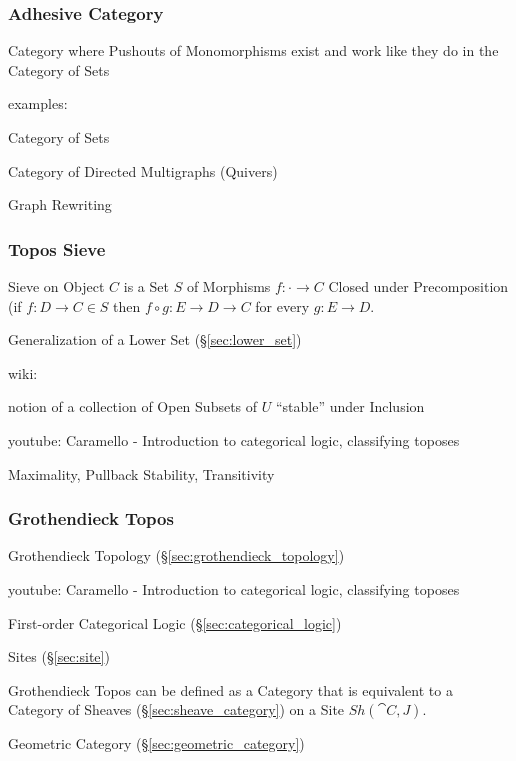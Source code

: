 \subsubsection{Adhesive Category}\label{sec:adhesive_category}

Category where Pushouts of Monomorphisms exist and work like they do in the
Category of Sets

examples:

Category of Sets

Category of Directed Multigraphs (Quivers)

Graph Rewriting %



\subsubsection{Topos Sieve}\label{sec:topos_sieve}

Sieve on Object $C$ is a Set $S$ of Morphisms $f : \cdot \rightarrow
C$ Closed under Precomposition (if $f : D \rightarrow C \in S$ then $f
\circ g : E \rightarrow D \rightarrow C$ for every $g : E \rightarrow
D$.

Generalization of a Lower Set (\S\ref{sec:lower_set})

wiki:

notion of a collection of Open Subsets of $U$ ``stable'' under
Inclusion %

youtube: Caramello - Introduction to categorical logic, classifying
toposes

Maximality, Pullback Stability, Transitivity %



\subsubsection{Grothendieck Topos}\label{sec:grothendieck_topos}

Grothendieck Topology (\S\ref{sec:grothendieck_topology})

youtube: Caramello - Introduction to categorical logic, classifying
toposes

First-order Categorical Logic (\S\ref{sec:categorical_logic})

Sites (\S\ref{sec:site})

Grothendieck Topos can be defined as a Category that is equivalent to
a Category of Sheaves (\S\ref{sec:sheave_category}) on a Site
$Sh(\cat{C},J)$.

Geometric Category (\S\ref{sec:geometric_category})

